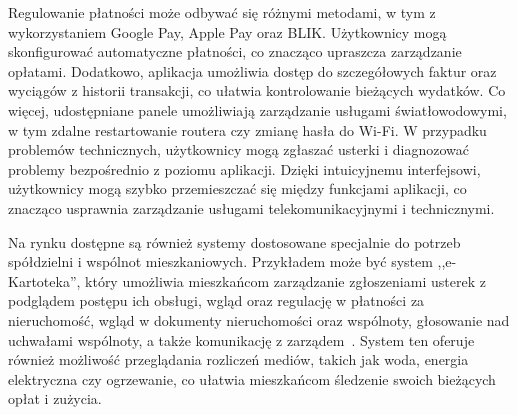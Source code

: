 Regulowanie płatności może odbywać się różnymi metodami, w tym z wykorzystaniem Google Pay, Apple Pay oraz BLIK. Użytkownicy mogą skonfigurować automatyczne płatności, co znacząco upraszcza zarządzanie opłatami. Dodatkowo, aplikacja umożliwia dostęp do szczegółowych faktur oraz wyciągów z historii transakcji, co ułatwia kontrolowanie bieżących wydatków. Co więcej, udostępniane panele umożliwiają zarządzanie usługami światłowodowymi, w tym zdalne restartowanie routera czy zmianę hasła do Wi-Fi. W przypadku problemów technicznych, użytkownicy mogą zgłaszać usterki i diagnozować problemy bezpośrednio z poziomu aplikacji. Dzięki intuicyjnemu interfejsowi, użytkownicy mogą szybko przemieszczać się między funkcjami aplikacji, co znacząco usprawnia zarządzanie usługami telekomunikacyjnymi i technicznymi.

Na rynku dostępne są również systemy dostosowane specjalnie do potrzeb spółdzielni i wspólnot mieszkaniowych. Przykładem może być system ,,e-Kartoteka'', który umożliwia mieszkańcom zarządzanie zgłoszeniami usterek z podglądem postępu ich obsługi, wgląd oraz regulację w płatności za nieruchomość, wgląd w dokumenty nieruchomości oraz wspólnoty, głosowanie nad uchwałami wspólnoty, a także komunikację z zarządem~\cite{e-kartoteka}. System ten oferuje również możliwość przeglądania rozliczeń mediów, takich jak woda, energia elektryczna czy ogrzewanie, co ułatwia mieszkańcom śledzenie swoich bieżących opłat i zużycia. 

